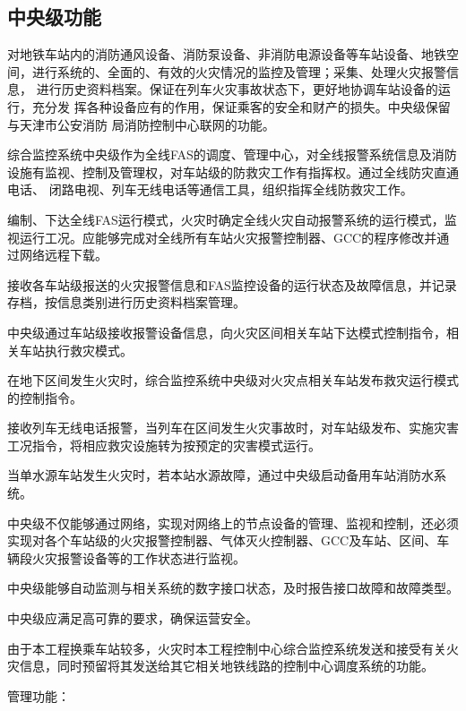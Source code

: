 \subsection{中央级功能}
对地铁车站内的消防通风设备、消防泵设备、非消防电源设备等车站设备、地铁空 间，进行系统的、全面的、有效的火灾情况的监控及管理；采集、处理火灾报警信息， 进行历史资料档案。保证在列车火灾事故状态下，更好地协调车站设备的运行，充分发 挥各种设备应有的作用，保证乘客的安全和财产的损失。中央级保留与天津市公安消防 局消防控制中心联网的功能。\par 
综合监控系统中央级作为全线FAS的调度、管理中心，对全线报警系统信息及消防 设施有监视、控制及管理权，对车站级的防救灾工作有指挥权。通过全线防灾直通电话、 闭路电视、列车无线电话等通信工具，组织指挥全线防救灾工作。\par 
编制、下达全线FAS运行模式，火灾时确定全线火灾自动报警系统的运行模式，监 视运行工况。应能够完成对全线所有车站火灾报警控制器、GCC的程序修改并通过网络远程下载。\par 
接收各车站级报送的火灾报警信息和FAS监控设备的运行状态及故障信息，并记录 存档，按信息类别进行历史资料档案管理。\par
中央级通过车站级接收报警设备信息，向火灾区间相关车站下达模式控制指令，相关车站执行救灾模式。\par
在地下区间发生火灾时，综合监控系统中央级对火灾点相关车站发布救灾运行模式的控制指令。\par
接收列车无线电话报警，当列车在区间发生火灾事故时，对车站级发布、实施灾害工况指令，将相应救灾设施转为按预定的灾害模式运行。\par
当单水源车站发生火灾时，若本站水源故障，通过中央级启动备用车站消防水系统。\par
中央级不仅能够通过网络，实现对网络上的节点设备的管理、监视和控制，还必须实现对各个车站级的火灾报警控制器、气体灭火控制器、GCC及车站、区间、车辆段火灾报警设备等的工作状态进行监视。\par
中央级能够自动监测与相关系统的数字接口状态，及时报告接口故障和故障类型。\par
中央级应满足高可靠的要求，确保运营安全。\par
由于本工程换乘车站较多，火灾时本工程控制中心综合监控系统发送和接受有关火 灾信息，同时预留将其发送给其它相关地铁线路的控制中心调度系统的功能。

管理功能：

